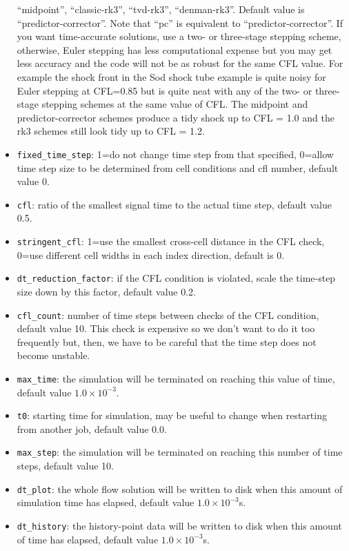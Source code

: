\begin{itemize}
  ``midpoint'', ``classic-rk3'', ``tvd-rk3'', ``denman-rk3''.
  Default value is ``predictor-corrector''.
  Note that ``pc'' is equivalent to ``predictor-corrector''.
  If you want time-accurate solutions, use a two- or three-stage stepping scheme,
  otherwise, Euler stepping has less computational expense 
  but you may get less accuracy and the code will not be as robust for the same CFL value.
  For example the shock front in the Sod shock tube example is quite noisy for Euler
  stepping at CFL=0.85 but is quite neat with any of the two- or three-stage stepping schemes
  at the same value of CFL.  
  The midpoint and predictor-corrector schemes produce a tidy shock up to CFL = 1.0
  and the rk3 schemes still look tidy up to CFL = 1.2.
\item \texttt{fixed\_time\_step}\ddag: 1=do not change time step from that specified, 
  0=allow time step size to be determined from cell conditions and cfl number, default value 0.
\item \texttt{cfl}\ddag: ratio of the smallest signal time to the actual time step,
  default value 0.5.
\item \texttt{stringent\_cfl}\ddag: 1=use the smallest cross-cell distance in the
  CFL check, 0=use different cell widths in each index direction, default is 0.
\item \texttt{dt\_reduction\_factor}\ddag: if the CFL condition is violated, scale the time-step size
  down by this factor, default value 0.2.
\item \texttt{cfl\_count}: number of time steps between checks of the CFL
  condition, default value 10.
  This check is expensive so we don't want to do it too frequently but, then,
  we have to be careful that the time step does not become unstable.
\item \texttt{max\_time}\ddag: the simulation will be terminated on reaching this
  value of time, default value $1.0 \times 10^{-3}$.
\item \texttt{t0}: starting time for simulation, may be useful to change when restarting from another job,
  default value 0.0.
\item \texttt{max\_step}\ddag: the simulation will be terminated on reaching this
  number of time steps, default value 10.
\item \texttt{dt\_plot}\ddag: the whole flow solution will be written to disk when
  this amount of simulation time has elapsed, default value $1.0 \times 10^{-3}$s.
\item \texttt{dt\_history}\ddag: the history-point data will be written to disk
  when this amount of time has elapsed, default value $1.0 \times 10^{-3}$s.
\end{itemize}

